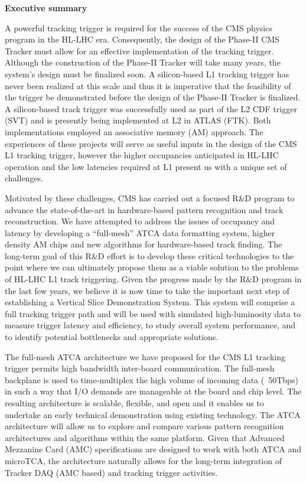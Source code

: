 \begin{center}
{\Large\bf Executive summary}
\end{center}

\vspace{0.5cm}

\noindent A powerful tracking trigger is required for the success of the CMS physics program in the HL-LHC era.  Consequently, the design of the Phase-II CMS Tracker must allow for an effective implementation of the tracking trigger.  Although the construction of the Phase-II Tracker will take many years, the system's design must be finalized soon.  A silicon-based L1 tracking trigger has never been realized at this scale and thus it is imperative that the feasibility of the trigger be demonstrated before the design of the Phase-II Tracker is finalized.  A silicon-based track trigger was successfully used as part of the L2 CDF trigger (SVT) and is presently being implemented at L2 in ATLAS (FTK).  Both implementations employed an associative memory (AM) approach.  The experiences of these projects will serve as useful inputs in the design of the CMS L1 tracking trigger, however the higher occupancies anticipated in HL-LHC operation and the low latencies required at L1 present us with a unique set of challenges.

\noindent Motivated by these challenges, CMS has carried out a focused R\&D program to advance the state-of-the-art in hardware-based pattern recognition and track reconstruction.  We have attempted to address the issues of occupancy and latency by developing a ``full-mesh'' ATCA data formatting system, higher density AM chips and new algorithms for hardware-based track finding.  The long-term goal of this R\&D effort is to develop these critical technologies to the point where we can ultimately propose them as a viable solution to the problems of HL-LHC L1 track triggering.  Given the progress made by the R\&D program in the last few years, we believe it is now time to take the important next step of establishing a Vertical Slice Demonstration System.  This system will comprise a full tracking trigger path and will be used with simulated high-luminosity data to measure trigger latency and efficiency, to study overall system performance, and to identify potential bottlenecks and appropriate solutions.

\noindent The full-mesh ATCA architecture we have proposed for the CMS L1 tracking trigger permits high bandwidth inter-board communication.  The full-mesh backplane is used to time-multiplex the high volume of incoming data (~50Tbps) in such a way that I/O demands are manageable at the board and chip level.  The resulting architecture is scalable, flexible, and open and it enables us to undertake an early technical demonstration using existing technology.  The ATCA architecture will allow us to explore and compare various pattern recognition architectures and algorithms within the same platform.  Given that Advanced Mezzanine Card (AMC) specifications are designed to work with both ATCA and microTCA, the architecture naturally allows for the long-term integration of Tracker DAQ (AMC based) and tracking trigger activities.  

